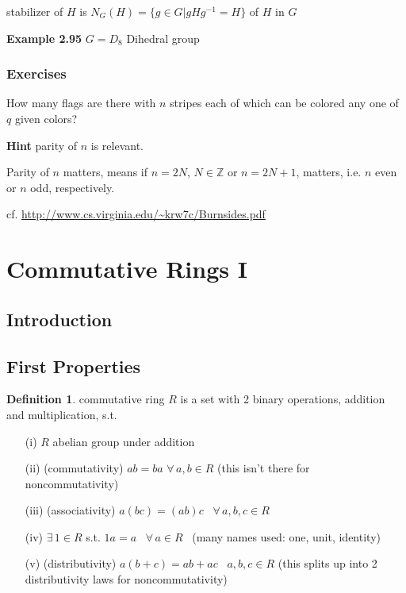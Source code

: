 \documentclass[twoside,landscape]{amsart}
\theoremstyle{plain}
\theoremstyle{definition}
\newtheorem{definition}{Definition}
\theoremstyle{remark}
\newcommand{\exercisehead}[1]
  { \smallskip
   \noindent{\small\bf Exercise #1.}
  }
\begin{document}
\begin{multicols*}{2}
stabilizer of $H$ is $N_G(H) = \lbrace g\in G | gHg^{-1} = H \rbrace$ \quad {} of $H$ in $G$

\textbf{Example 2.95} $G = D_8$ Dihedral group

\subsubsection*{Exercises}

\exercisehead{2.100} How many flags are there with $n$ stripes each of which can be colored any one of $q$ given colors?

\textbf{Hint} parity of $n$ is relevant.

Parity of $n$ matters, means if $n=2N$, $N\in\mathbb{Z}$ or $n=2N+1$, matters, i.e. $n$ even or $n$ odd, respectively.  

cf. \url{http://www.cs.virginia.edu/~krw7c/Burnsides.pdf}


\section{Commutative Rings I}



\subsection{Introduction}




\subsection{First Properties }

\begin{definition} commutative ring $R$ is a set with 2 binary operations, addition and multiplication, s.t.
\begin{enumerate}
  \item[(i)] $R$ abelian group under addition 
  \item[(ii)] (commutativity) $ab=ba$ \quad $\forall \, a,b \in R$  (this isn't there for noncommutativity)
  \item[(iii)] (associativity) $a(bc) = (ab)c$ \quad \, $\forall \, a,b,c\in R$
  \item[(iv)] $\exists \, 1 \in R$ s.t. $1a = a$ \, $\forall \, a  \in R$ \quad \, (many names used: one, unit, identity)
  \item[(v)] (distributivity) $a(b+c) = ab+ac$ \quad \, $a,b,c \in R$ (this splits up into 2 distributivity laws for noncommutativity)
\end{enumerate}
\end{definition}


\end{multicols*}
\end{document}
